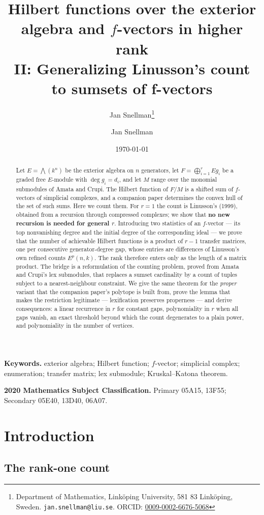 \documentclass[11pt, a4paper, abstract=yes]{scrartcl}
\author{Jan Snellman\thanks{Department of Mathematics, Linköping University, 581 83 Linköping, Sweden. \texttt{jan.snellman@liu.se}. ORCID: \href{https://orcid.org/0009-0002-6676-5068}{0009-0002-6676-5068}}}
\author{Jan Snellman \orcidlink{0009-0002-6676-5068}}
\date{\today}
\title{Hilbert functions over the exterior algebra and \(f\)-vectors in higher rank\\\medskip
\large II: Generalizing Linusson's count to sumsets of f-vectors}
\theoremstyle{definition}
\theoremstyle{remark}
\theoremstyle{plain}
\begin{document}
\maketitle
\begin{abstract}
Let \(E=\bigwedge(k^n)\) be the exterior algebra on \(n\) generators, let
\(F=\bigoplus_{i=1}^{r}Eg_i\) be a graded free \(E\)-module with \(\deg g_i=d_i\), and let \(M\)
range over the monomial submodules of Amata and Crupi. The Hilbert function of \(F/M\) is a shifted
sum of \(f\)-vectors of simplicial complexes, and a companion paper determines the convex hull of the
set of such sums. Here we count them. For \(r=1\) the count is Linusson's (1999), obtained from a
recursion through compressed complexes; we show that \textbf{no new recursion is needed for general
\(r\)}. Introducing two statistics of an \(f\)-vector --- its top nonvanishing degree and the initial
degree of the corresponding ideal --- we prove that the number of achievable Hilbert functions is a
product of \(r-1\) transfer matrices, one per consecutive generator-degree gap, whose entries are
differences of Linusson's own refined counts \(E^p(n,k)\). The rank therefore enters only as the
length of a matrix product. The bridge is a reformulation of the counting problem, proved from
Amata and Crupi's lex submodules, that replaces a sumset cardinality by a count of tuples subject to
a nearest-neighbour constraint. We give the same theorem for the \emph{proper} variant that the companion
paper's polytope is built from, prove the lemma that makes the restriction legitimate ---
lexification preserves properness --- and derive consequences: a linear recurrence in \(r\) for
constant gaps, polynomiality in \(r\) when all gaps vanish, an exact threshold beyond which the count
degenerates to a plain power, and polynomiality in the number of vertices.
\end{abstract}

\medskip\noindent\textbf{Keywords.} exterior algebra; Hilbert function; \(f\)-vector; simplicial
complex; enumeration; transfer matrix; lex submodule; Kruskal--Katona theorem.

\smallskip\noindent\textbf{2020 Mathematics Subject Classification.} Primary 05A15, 13F55;
Secondary 05E40, 13D40, 06A07.
\medskip

\setcounter{tocdepth}{2}
\tableofcontents
\section{Introduction}
\label{sec:orgcb83101}
\subsection{The rank-one count}
\label{sec:org1d4eb6d}
\end{document}
